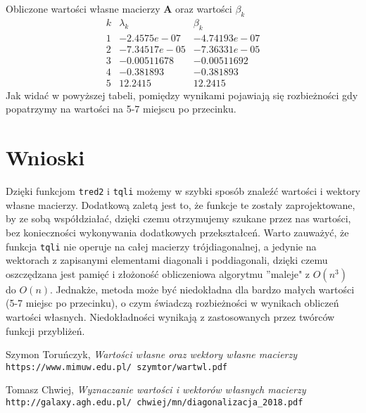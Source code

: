 \documentclass{article}
\begin{document}
Obliczone wartości własne macierzy \textbf{A} oraz wartości $\beta_k$
\begin{equation}
\begin{array}{|c|r|r|}
k & \lambda_k & \beta_k \\
\hline
1 & -2.4575e-07 & -4.74193e-07 \\
2 & -7.34517e-05 & -7.36331e-05 \\
3 & -0.00511678 & -0.00511692  \\
4 & -0.381893 & -0.381893\\
5 & 12.2415 & 12.2415
\end{array}
\end{equation}
Jak widać w powyższej tabeli, pomiędzy wynikami pojawiają się rozbieżności gdy popatrzymy na wartości na 5-7 miejscu po przecinku. 

\section{Wnioski}
Dzięki funkcjom \texttt{tred2} i \texttt{tqli} możemy w szybki sposób znaleźć wartości i wektory własne macierzy. Dodatkową zaletą jest to, że funkcje te zostały zaprojektowane, by ze sobą współdziałać, dzięki czemu otrzymujemy szukane przez nas wartości, bez konieczności wykonywania dodatkowych przekształceń. Warto zauważyć, że funkcja \texttt{tqli} nie operuje na całej macierzy trójdiagonalnej, a jedynie na wektorach z zapisanymi elementami diagonali i poddiagonali, dzięki czemu oszczędzana jest pamięć i złożoność obliczeniowa algorytmu ''maleje" z $O(n^3)$ do $O(n)$. Jednakże, metoda może być niedokładna dla bardzo małych wartości (5-7 miejsc po przecinku), o czym świadczą rozbieżności w wynikach obliczeń wartości własnych. Niedokładności wynikają z zastosowanych przez twórców funkcji przybliżeń. 

\begin{thebibliography}{9}

  Szymon Toruńczyk, \emph{Wartości własne oraz wektory własne macierzy} 
  \texttt{https://www.mimuw.edu.pl/~szymtor/wartwl.pdf}

  Tomasz Chwiej, \emph{Wyznaczanie wartości i wektorów własnych macierzy} 
  \texttt{http://galaxy.agh.edu.pl/~chwiej/mn/diagonalizacja\_2018.pdf}

\end{thebibliography}
\end{document}
